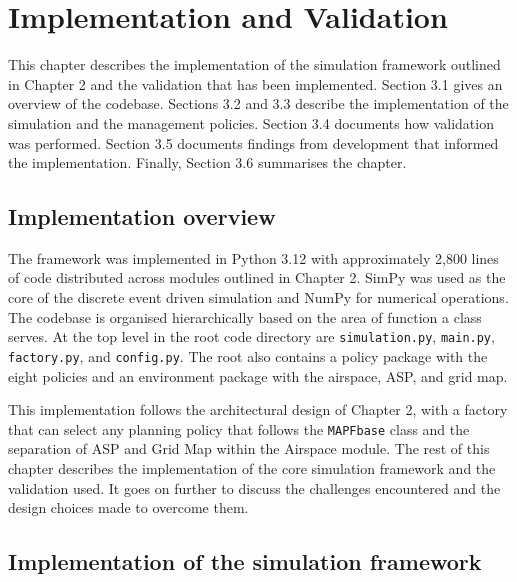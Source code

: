 \chapter{Implementation and Validation}
\label{chapter3}

This chapter describes the implementation of the simulation framework outlined in Chapter 2 and the validation that has been implemented. Section 3.1 gives an overview of the codebase. Sections 3.2 and 3.3 describe the implementation of the simulation and the management policies. Section 3.4 documents how validation was performed. Section 3.5 documents findings from development that informed the implementation. Finally, Section 3.6 summarises the chapter. \par

\vspace{1em}

\section{Implementation overview}

The framework was implemented in Python 3.12 with approximately 2,800 lines of code distributed across modules outlined in Chapter 2. SimPy was used as the core of the discrete event driven simulation and NumPy for numerical operations. The codebase is organised hierarchically based on the area of function a class serves. At the top level in the root code directory are \texttt{simulation.py}, \texttt{main.py}, \texttt{factory.py}, and \texttt{config.py}. The root also contains a policy package with the eight policies and an environment package with the airspace, ASP, and grid map. \par

\vspace{1em}

This implementation follows the architectural design of Chapter 2, with a factory that can select any planning policy that follows the \texttt{MAPFbase} class and the separation of ASP and Grid Map within the Airspace module. The rest of this chapter describes the implementation of the core simulation framework and the validation used. It goes on further to discuss the challenges encountered and the design choices made to overcome them. \par

\vspace{1em}

\section{Implementation of the simulation framework}

